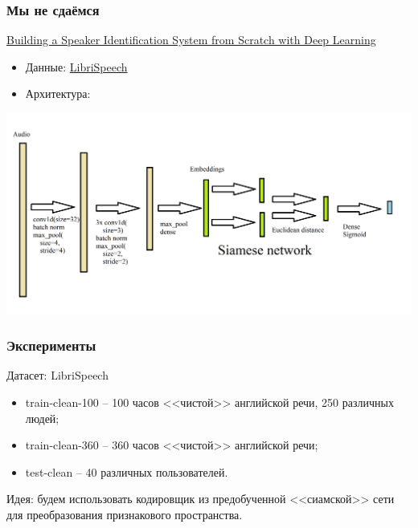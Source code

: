 \documentclass[11pt]{beamer}
\begin{document}
\begin{frame}
\frametitle{Мы не сдаёмся}
\href{https://medium.com/analytics-vidhya/building-a-speaker-identification-system-from-scratch-with-deep-learning-f4c4aa558a56}{Building a Speaker Identification System from Scratch with Deep Learning}
\begin{itemize}
\item Данные: \href{http://www.openslr.org/12/}{LibriSpeech}
\item Архитектура:
\end{itemize}
\includegraphics[width = \linewidth]{siamese.png}
\end{frame}

\begin{frame}
\frametitle{Эксперименты}

Датасет: LibriSpeech
\begin{itemize}
\item train-clean-100 -- 100 часов <<чистой>> английской речи, 250 различных людей;
\item train-clean-360 -- 360 часов <<чистой>> английской речи;
\item test-clean -- 40 различных пользователей.
\end{itemize}

Идея: будем использовать кодировщик из предобученной <<сиамской>> сети для преобразования признакового пространства.

\end{frame}
\end{document}

